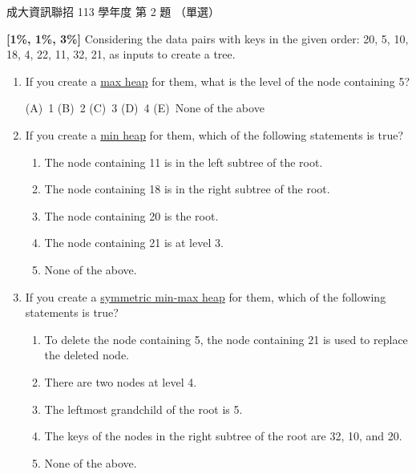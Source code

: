 \begin{pastexam}[label={px:ncku-113-prog-02}]{成大資訊聯招 113 學年度 第 2 題}
（單選）

\textbf{[1\%, 1\%, 3\%]} Considering the data pairs with keys in the given
order: 20, 5, 10, 18, 4, 22, 11, 32, 21, as inputs to create a tree.
\begin{enumerate}[label=\roman*)]
\item If you create a \underline{max heap} for them, what is the level of the node containing 5?

(A)~1 \qquad (B)~2 \qquad (C)~3 \qquad (D)~4 \qquad (E)~None of the above
\item If you create a \underline{min heap} for them, which of the following statements is true?
\begin{enumerate}[label=(\Alph*)]
\item The node containing 11 is in the left subtree of the root.
\item The node containing 18 is in the right subtree of the root.
\item The node containing 20 is the root.
\item The node containing 21 is at level 3.
\item None of the above.
\end{enumerate}
\item If you create a \underline{symmetric min-max heap} for them, which of the following statements is true?
\begin{enumerate}[label=(\Alph*)]
\item To delete the node containing 5, the node containing 21 is used to replace the deleted node.
\item There are two nodes at level 4.
\item The leftmost grandchild of the root is 5.
\item The keys of the nodes in the right subtree of the root are 32, 10, and 20.
\item None of the above.
\end{enumerate}
\end{enumerate}
\end{pastexam}

